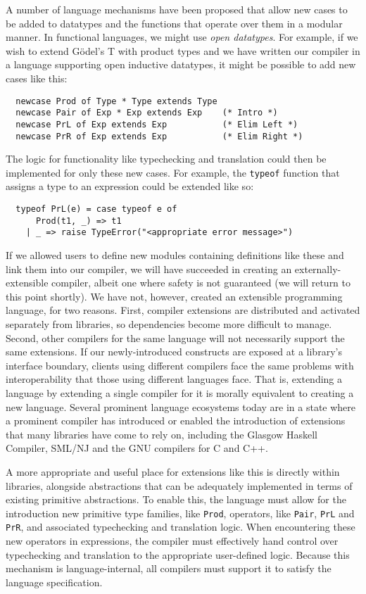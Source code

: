 A number of language mechanisms have been proposed that allow new cases to be added to datatypes and the functions that operate over them in a modular manner. 
In functional languages, we might use \emph{open datatypes}. For example, if we wish to extend G\"odel's T with product types and we have written our compiler in a language supporting open inductive datatypes, it might be possible to add new cases like this: 
\begin{lstlisting}
  newcase Prod of Type * Type extends Type
  newcase Pair of Exp * Exp extends Exp    (* Intro *)
  newcase PrL of Exp extends Exp           (* Elim Left *)
  newcase PrR of Exp extends Exp           (* Elim Right *)
\end{lstlisting}

The logic for functionality like typechecking and translation could then be implemented for only these new cases. For example, the \lstinline{typeof} function that assigns a type to an expression could be extended like so:
\begin{lstlisting}
  typeof PrL(e) = case typeof e of 
      Prod(t1, _) => t1 
    | _ => raise TypeError("<appropriate error message>")
\end{lstlisting}

If we allowed users to define new modules containing definitions like these and link them into our compiler, we will have succeeded in creating an externally-extensible compiler, albeit one where safety is not guaranteed (we will return to this point shortly). We have not, however, created an extensible programming language, for two reasons. First, compiler extensions are distributed and activated separately from libraries, so dependencies become more difficult to manage. Second, other compilers for the same language will not necessarily support the same extensions. 
If our newly-introduced constructs are exposed at a library's  interface boundary, clients using different compilers face the same problems with interoperability that those using different languages face. That is, {extending a language by extending a single compiler for it is morally equivalent to creating a new language}. Several prominent language ecosystems today are in a state where a prominent compiler has introduced or enabled the introduction of extensions that many libraries have come to rely on, including the Glasgow Haskell Compiler, SML/NJ and the GNU compilers for C and C++.

A more appropriate and useful place for extensions like this is directly within libraries, alongside abstractions that can be adequately implemented in terms of existing primitive abstractions. To enable this, the language must allow for the introduction new primitive type families, like \lstinline{Prod}, operators, like \lstinline{Pair}, \lstinline{PrL} and \lstinline{PrR}, and associated typechecking and translation logic. When encountering these new operators in expressions, the compiler must effectively  hand control over typechecking and translation to the appropriate user-defined logic. Because this mechanism is {language-internal}, all compilers must support it to satisfy the language specification.

